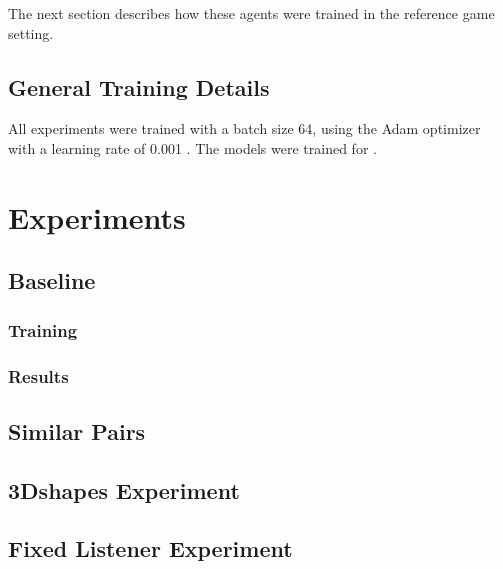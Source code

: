 The next section describes how these agents were trained in the reference game setting.

\subsection{General Training Details}

All experiments were trained with a batch size 64, using the Adam optimizer with a learning rate  of 0.001 \parencite{kingma2014adam}. The models were trained for . 

\section{Experiments}

\subsection{Baseline}

\subsubsection{Training}
\subsubsection{Results}

\subsection{Similar Pairs}

\subsection{3Dshapes Experiment}

\subsection{Fixed Listener Experiment}